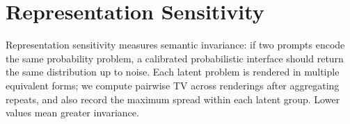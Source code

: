 \documentclass[twoside]{article}
\begin{document}







\clearpage
\appendix
\thispagestyle{empty}

\onecolumn

\section{Representation Sensitivity}
\label{app:repr}

Representation sensitivity measures semantic invariance: if two prompts encode the same probability problem, a calibrated probabilistic interface should return the same distribution up to noise. Each latent problem is rendered in multiple equivalent forms; we compute pairwise TV across renderings after aggregating repeats, and also record the maximum spread within each latent group. Lower values mean greater invariance.
\end{document}
